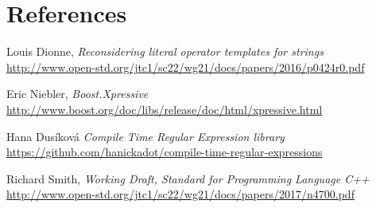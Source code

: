 \documentclass{wg21}
\begin{document}
\section{References}
\renewcommand{\section}[2]{}%
\begin{thebibliography}{9}

    Louis Dionne,
    \emph{Reconsidering literal operator templates for strings}\newline
    \url{http://www.open-std.org/jtc1/sc22/wg21/docs/papers/2016/p0424r0.pdf}

    Eric Niebler,
    \emph{Boost.Xpressive}\newline
    \url{http://www.boost.org/doc/libs/release/doc/html/xpressive.html}

    Hana Dus\'{i}kov\'{a}
    \emph{Compile Time Regular Expression library}\newline
    \url{https://github.com/hanickadot/compile-time-regular-expressions}

    Richard Smith,
    \emph{Working Draft, Standard for Programming Language C++}\newline
    \url{http://www.open-std.org/jtc1/sc22/wg21/docs/papers/2017/n4700.pdf}

\end{thebibliography}
\end{document}
